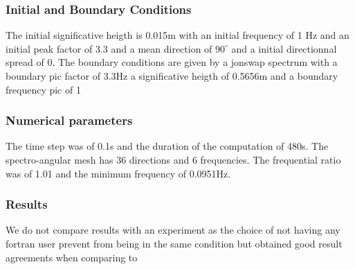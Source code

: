%
%
\subsubsection{Initial and Boundary Conditions}
%
    The initial  significative heigth is 0.015m with an initial frequency of 1 Hz and an initial peak factor of 3.3 and a mean direction of $90^{\circ}$ and a initial directionnal spread of 0.
The boundary conditions are given by a jonswap spectrum with a boundary pic factor of 3.3Hz a significative heigth of 0.5656m and a boundary frequency pic of 1

%
%
\subsubsection{Numerical parameters}
%
The time step was of 0.1s and the duration of the computation of 480s. The spectro-angular mesh has 36 directions and 6 frequencies. The frequential ratio was of 1.01 and the minimum frequency of 0.0951Hz.

\subsubsection{Results}
We do not compare results with an experiment as the choice of not having any fortran user prevent from being in the same condition but \cite{vito} obtained good result agreements when comparing to \cite{mendez}